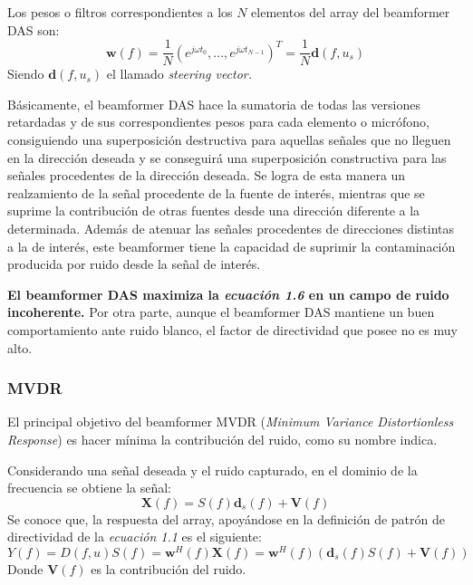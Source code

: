 \documentclass[a4paper,11pt]{book}
\begin{document}
		Los pesos o filtros correspondientes a los $N$ elementos del array del beamformer DAS son:
		\begin{equation}
		\textbf{w}(f) = \frac{1}{N} (e^{j \omega t_{0}},...,e^{j \omega t_{N-1}})^{T} = \frac{1}{N} \textbf{d}(f,u_{s})
		\end{equation}
		Siendo $\textbf{d}(f,u_{s})$ el llamado \textit{steering vector.}

		Básicamente, el beamformer DAS hace la sumatoria de todas las versiones retardadas y de sus correspondientes pesos para cada elemento o micrófono, consiguiendo una superposición destructiva para aquellas señales que no lleguen en la dirección deseada y se conseguirá una superposición constructiva para las señales procedentes de la dirección deseada. Se logra de esta manera un realzamiento de la señal procedente de la fuente de interés, mientras que se suprime la contribución de otras fuentes desde una dirección diferente a la determinada. Además de atenuar las señales procedentes de direcciones distintas a la de interés, este beamformer tiene la capacidad de suprimir la contaminación producida por ruido desde la señal de interés.
		
\textbf{		El beamformer DAS maximiza la \textit{ecuación 1.6} en un campo de ruido incoherente.} Por otra parte, aunque el beamformer DAS mantiene un buen comportamiento ante ruido blanco, el factor de directividad que posee no es muy alto.
		
		\subsubsection{MVDR}
		El principal objetivo del beamformer MVDR (\textit{Minimum Variance Distortionless Response}) es hacer mínima la contribución del ruido, como su nombre indica.
		
		Considerando una señal deseada y el ruido capturado, en el dominio de la frecuencia se obtiene la señal:
		\begin{equation}
		\textbf{X}(f) = S(f)\textbf{d}_{s}(f) + \textbf{V}(f)
		\end{equation}
	Se conoce que, la respuesta del array, apoyándose en la definición de patrón de directividad de la \textit{ecuación 1.1} es el siguiente:
	\begin{equation}
	Y(f) = D(f,u) S(f) = \textbf{w}^{H}(f) \textbf{X}(f) = \textbf{w}^{H}(f)(\textbf{d}_{s}(f) S(f) + \textbf{V}(f))
	\end{equation}
	Donde $\textbf{V}(f)$ es la contribución del ruido.
	
\end{document}

